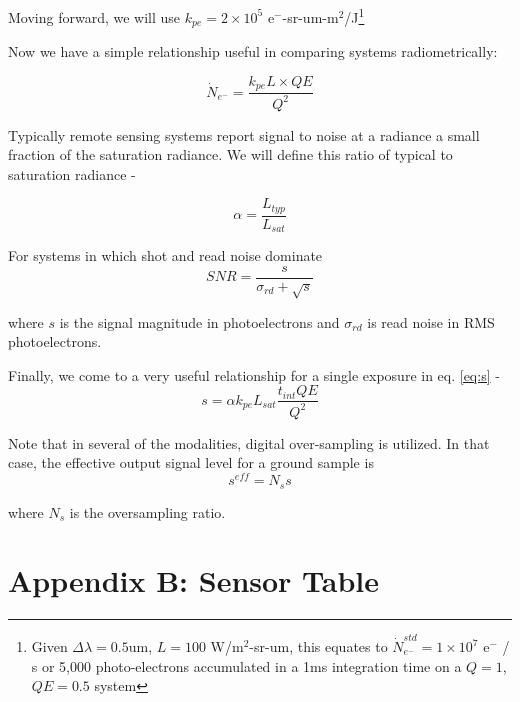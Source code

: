 \documentclass[10pt,journal]{IEEEtran}  %
\begin{document}
Moving forward, we will use $k_{pe} = 2\times 10^5$ e$^-$-sr-um-m$^2$/J\footnote{Given $\Delta \lambda = 0.5$um, $L = 100$ W/m$^2$-sr-um, this equates to $\dot{N}_{e^-}^{std} = 1\times 10^7$ e$^-$ / s or 5,000 photo-electrons accumulated in a 1ms integration time on a $Q=1$, $QE=0.5$ system}

Now we have a simple relationship useful in comparing systems radiometrically:

\begin{equation}
\dot{N}_{e^-} = \frac{k_{pe} L \times QE}{Q^2}
\label{eq:N_e_dot}
\end{equation}

Typically remote sensing systems report signal to noise at a radiance a small fraction of the saturation radiance.  We will define this ratio of typical to saturation radiance - 

\begin{equation}
\alpha = \frac{L_{typ}}{L_{sat}}
\label{eq:alpha}
\end{equation}

For systems in which shot and read noise dominate
\begin{equation}
SNR = \frac{s}{\sigma_{rd} + \sqrt{s}}
\label{eq:snr}
\end{equation}

where $s$ is the signal magnitude in photoelectrons and $\sigma_{rd}$ is read noise in RMS photoelectrons.

Finally, we come to a very useful relationship for a single exposure in eq. \eqref{eq:s} -
\begin{equation}
s = \alpha k_{pe}L_{sat} \frac{t_{int}QE}{Q^2}
\label{eq:s}
\end{equation}

Note that in several of the modalities, digital over-sampling is utilized.  In that case, the effective output signal level for a ground sample is 
\begin{equation*}
    s^{eff} = N_s s
\end{equation*}

where $N_s$ is the oversampling ratio.

\onecolumn
\section{Appendix B: Sensor Table}
\label{sec:appendix_b}


\twocolumn


\end{document}

